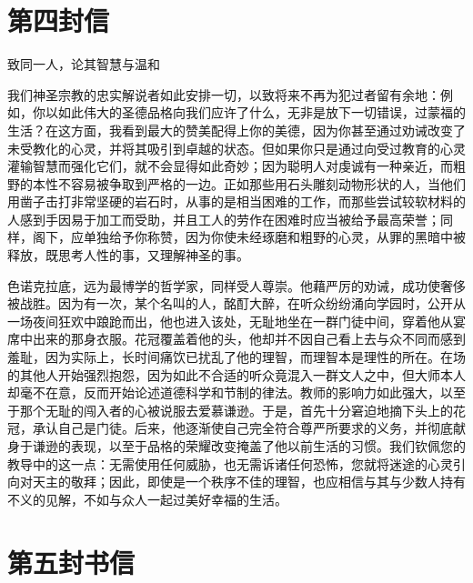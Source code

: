 
\section{第四封信}

致同一人，论其智慧与温和\par

我们神圣宗教的忠实解说者如此安排一切，以致将来不再为犯过者留有余地：例如，你以如此伟大的圣德品格向我们应许了什么，无非是放下一切错误，过蒙福的生活？在这方面，我看到最大的赞美配得上你的美德，因为你甚至通过劝诫改变了未受教化的心灵，并将其吸引到卓越的状态。但如果你只是通过向受过教育的心灵灌输智慧而强化它们，就不会显得如此奇妙；因为聪明人对虔诚有一种亲近，而粗野的本性不容易被争取到严格的一边。正如那些用石头雕刻动物形状的人，当他们用凿子击打非常坚硬的岩石时，从事的是相当困难的工作，而那些尝试较软材料的人感到手因易于加工而受助，并且工人的劳作在困难时应当被给予最高荣誉；同样，阁下，应单独给予你称赞，因为你使未经琢磨和粗野的心灵，从罪的黑暗中被释放，既思考人性的事，又理解神圣的事。\par

色诺克拉底，远为最博学的哲学家，同样受人尊崇。他藉严厉的劝诫，成功使奢侈被战胜。因为有一次，某个名叫的人，酩酊大醉，在听众纷纷涌向学园时，公开从一场夜间狂欢中踉跄而出，他也进入该处，无耻地坐在一群门徒中间，穿着他从宴席中出来的那身衣服。花冠覆盖着他的头，他却并不因自己看上去与众不同而感到羞耻，因为实际上，长时间痛饮已扰乱了他的理智，而理智本是理性的所在。在场的其他人开始强烈抱怨，因为如此不合适的听众竟混入一群文人之中，但大师本人却毫不在意，反而开始论述道德科学和节制的律法。教师的影响力如此强大，以至于那个无耻的闯入者的心被说服去爱慕谦逊。于是，首先十分窘迫地摘下头上的花冠，承认自己是门徒。后来，他逐渐使自己完全符合尊严所要求的义务，并彻底献身于谦逊的表现，以至于品格的荣耀改变掩盖了他以前生活的习惯。我们钦佩您的教导中的这一点：无需使用任何威胁，也无需诉诸任何恐怖，您就将迷途的心灵引向对天主的敬拜；因此，即使是一个秩序不佳的理智，也应相信与其与少数人持有不义的见解，不如与众人一起过美好幸福的生活。\par


\section{第五封书信}

